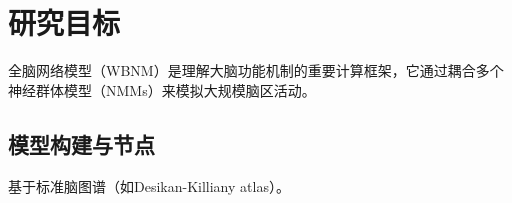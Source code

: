 
\section{研究目标}

全脑网络模型（WBNM）是理解大脑功能机制的重要计算框架，它通过耦合多个神经群体模型（NMMs）来模拟大规模脑区活动。

\subsection{模型构建与节点}

基于标准脑图谱（如Desikan-Killiany atlas）。